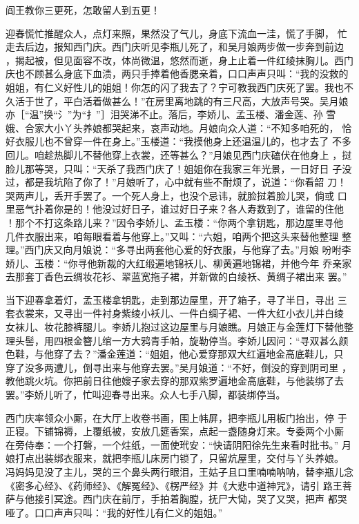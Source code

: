 阎王教你三更死，怎敢留人到五更！

迎春慌忙推醒众人，点灯来照，果然没了气儿，身底下流血一洼，慌了手脚，
忙走去后边，报知西门庆。西门庆听见李瓶儿死了，和吴月娘两步做一步奔到前边
，揭起被，但见面容不改，体尚微温，悠然而逝，身上止着一件红绫抹胸儿。西门
庆也不顾甚么身底下血渍，两只手捧着他香腮亲着，口口声声只叫：“我的没救的
姐姐，有仁义好性儿的姐姐！你怎的闪了我去了？宁可教我西门庆死了罢。我也不
久活于世了，平白活着做甚么！”在房里离地跳的有三尺高，大放声号哭。吴月娘
亦［“温”换“氵”为“扌”］泪哭涕不止。落后，李娇儿、孟玉楼、潘金莲、孙
雪娥、合家大小丫头养娘都哭起来，哀声动地。月娘向众人道：“不知多咱死的，
恰好衣服儿也不曾穿一件在身上。”玉楼道：“我摸他身上还温温儿的，也才去了
不多回儿。咱趁热脚儿不替他穿上衣裳，还等甚么？”月娘见西门庆磕伏在他身上
，挝脸儿那等哭，只叫：“天杀了我西门庆了！姐姐你在我家三年光景，一日好日
子没过，都是我坑陷了你了！”月娘听了，心中就有些不耐烦了，说道：“你看韶
刀！哭两声儿，丢开手罢了。一个死人身上，也没个忌讳，就脸挝着脸儿哭，倘或
口里恶气扑着你是的！他没过好日子，谁过好日子来？各人寿数到了，谁留的住他
！那个不打这条路儿来？”因令李娇儿、孟玉楼：“你两个拿钥匙，那边屋里寻他
几件衣服出来，咱每眼看着与他穿上。”又叫：“六姐，咱两个把这头来替他整理
整理。”西门庆又向月娘说：“多寻出两套他心爱的好衣服，与他穿了去。”月娘
吩咐李娇儿、玉楼：“你寻他新裁的大红缎遍地锦袄儿、柳黄遍地锦裙，并他今年
乔亲家去那套丁香色云绸妆花衫、翠蓝宽拖子裙，并新做的白绫袄、黄绸子裙出来
罢。”

当下迎春拿着灯，孟玉楼拿钥匙，走到那边屋里，开了箱子，寻了半日，寻出
三套衣裳来，又寻出一件衬身紫绫小袄儿、一件白绸子裙、一件大红小衣儿并白绫
女袜儿、妆花膝裤腿儿。李娇儿抱过这边屋里与月娘瞧。月娘正与金莲灯下替他整
理头髻，用四根金簪儿绾一方大鸦青手帕，旋勒停当。李娇儿因问：“寻双甚么颜
色鞋，与他穿了去？”潘金莲道：“姐姐，他心爱穿那双大红遍地金高底鞋儿，只
穿了没多两遭儿，倒寻出来与他穿去罢。”吴月娘道：“不好，倒没的穿到阴司里
，教他跳火坑。你把前日往他嫂子家去穿的那双紫罗遍地金高底鞋，与他装绑了去
罢。”李娇儿听了，忙叫迎春寻出来。众人七手八脚，都装绑停当。

西门庆率领众小厮，在大厅上收卷书画，围上帏屏，把李瓶儿用板门抬出，停
于正寝。下铺锦褥，上覆纸被，安放几筵香案，点起一盏随身灯来。专委两个小厮
在旁侍奉：一个打磐，一个炷纸，一面使玳安：“快请阴阳徐先生来看时批书。”
月娘打点出装绑衣服来，就把李瓶儿床房门锁了，只留炕屋里，交付与丫头养娘。
冯妈妈见没了主儿，哭的三个鼻头两行眼泪，王姑子且口里喃喃呐呐，替李瓶儿念
《密多心经》、《药师经》、《解冤经》、《楞严经》并《大悲中道神咒》，请引
路王菩萨与他接引冥途。西门庆在前厅，手拍着胸膛，抚尸大恸，哭了又哭，把声
都哭哑了。口口声声只叫：“我的好性儿有仁义的姐姐。”

